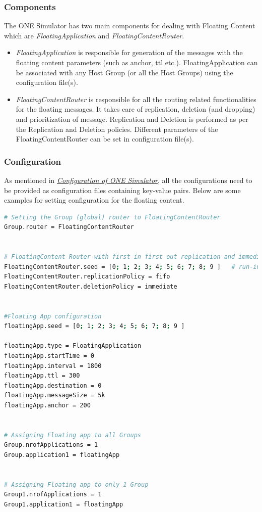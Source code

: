 \subsubsection{Components}
The ONE Simulator has two main components for dealing with Floating Content which are \textit{FloatingApplication} and \textit{FloatingContentRouter}.

\begin{itemize}
\item \textit{FloatingApplication} is responsible for generation of the messages with the floating content parameters (such as anchor, ttl etc.). FloatingApplication can be associated with any Host Group (or all the Host Groups) using the configuration file(s).
\item \textit{FloatingContentRouter} is responsible for all the routing related functionalities for the floating messages. It takes care of replication, deletion (and dropping) and prioritization of message. Replication and Deletion is performed as per the Replication and Deletion policies. Different parameters of the FloatingContentRouter can be set in configuration file(s).
\end{itemize}


\subsubsection{Configuration}
As mentioned in \hyperref[one:configuration]{\emph{Configuration of ONE Simulator}}, all the configurations need to be provided as configuration files containing key-value pairs. Below are some examples for setting configuration for the floating content.

\begin{lstlisting}[language=bash]
# Setting the Group (global) router to FloatingContentRouter
Group.router = FloatingContentRouter


# FloatingContent Router with first in first out replication and immediate deletion
FloatingContentRouter.seed = [0; 1; 2; 3; 4; 5; 6; 7; 8; 9 ]   # run-indexed seed for random number generator
FloatingContentRouter.replicationPolicy = fifo
FloatingContentRouter.deletionPolicy = immediate


#Floating App configuration
floatingApp.seed = [0; 1; 2; 3; 4; 5; 6; 7; 8; 9 ]

floatingApp.type = FloatingApplication
floatingApp.startTime = 0
floatingApp.interval = 1800
floatingApp.ttl = 300
floatingApp.destination = 0
floatingApp.messageSize = 5k
floatingApp.anchor = 200


# Assigning Floating app to all Groups
Group.nrofApplications = 1
Group.application1 = floatingApp


# Assigning Floating app to only 1 Group
Group1.nrofApplications = 1
Group1.application1 = floatingApp

\end{lstlisting}
